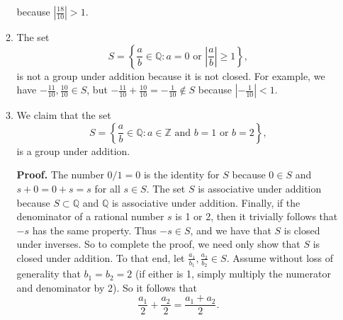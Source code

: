 \documentclass[9pt]{article}
\newcommand{\Z}{\mathbb{Z}}
\newcommand{\Q}{\mathbb{Q}}
\begin{document}
\begin{enumerate}
\begin{enumerate}
               because $\left|\frac{18}{10}\right| > 1$.
         \item The set
               $$S = \left\{\frac{a}{b} \in \Q : a = 0 \text{ or }
                     \left|\frac{a}{b}\right| \ge 1\right\},$$
               is not a group under addition because it is not closed. For
               example, we have $-\frac{11}{10}, \frac{10}{10} \in S$, but
               $-\frac{11}{10} + \frac{10}{10} = -\frac{1}{10} \notin S$ because
               $\left|-\frac{1}{10}\right| < 1$.
         \item We claim that the set
               $$S = \left\{\frac{a}{b} \in \Q : a \in \Z \text{ and }
                   b = 1 \text{ or } b = 2\right\},$$
               is a group under addition.

               \textbf{Proof.} The number $0/1 = 0$ is the identity for $S$
               because $0 \in S$ and $s + 0 = 0 + s = s$ for all $s \in S$. The
               set $S$ is associative under addition because $S \subset \Q$ and
               $\Q$ is associative under addition. Finally, if the denominator
               of a rational number $s$ is 1 or 2, then it trivially follows
               that $-s$ has the same property. Thus $-s \in S$, and we have
               that $S$ is closed under inverses. So to complete the proof, we
               need only show that $S$ is closed under addition. To that end,
               let $\frac{a_1}{b_1}, \frac{a_2}{b_2} \in S$. Assume without loss
               of generality that $b_1 = b_2 = 2$ (if either is 1, simply
               multiply the numerator and denominator by 2). So it follows that
               $$\frac{a_1}{2} + \frac{a_2}{2} = \frac{a_1+a_2}{2}.$$
               

\end{enumerate}
\end{enumerate}
\end{document}
